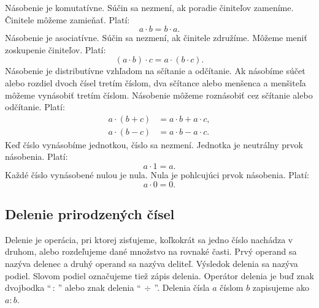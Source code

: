 \documentclass{article}
\begin{document}
Násobenie je komutatívne. Súčin sa nezmení, ak poradie činiteľov zameníme. Činitele môžeme zamieňať. Platí:
\[
a \cdot b = b \cdot a.
\]
Násobenie je asociatívne. Súčin sa nezmení, ak činitele združíme. Môžeme meniť zoskupenie činiteľov. Platí:
\[
(a \cdot b) \cdot c = a \cdot (b \cdot c).
\]
Násobenie je distributívne vzhľadom na sčítanie a odčítanie. Ak násobíme súčet alebo rozdiel dvoch čísel tretím číslom, dva sčítance alebo menšenca a menšiteľa môžeme vynásobiť tretím číslom. Násobenie môžeme roznásobiť cez sčítanie alebo odčítanie. Platí:
\[
\begin{aligned}
  a \cdot (b + c) &= a \cdot b + a \cdot c, \\
  a \cdot (b - c) &= a \cdot b - a \cdot c.
\end{aligned}
\]
Keď číslo vynásobíme jednotkou, číslo sa nezmení. Jednotka je neutrálny prvok násobenia. Platí:
\[
a \cdot 1 = a.
\]
Každé číslo vynásobené nulou je nula. Nula je pohlcujúci prvok násobenia. Platí:
\[
a \cdot 0 = 0.
\]

\subsection{Delenie prirodzených čísel}

Delenie je operácia, pri ktorej zisťujeme, koľkokrát sa jedno číslo nachádza v druhom, alebo rozdeľujeme dané množstvo na rovnaké časti. Prvý operand sa nazýva delenec a druhý operand sa nazýva deliteľ. Výsledok delenia sa nazýva podiel. Slovom podiel označujeme tiež zápis delenia. Operátor delenia je buď znak dvojbodka \enquote{\(\, :\, \)} alebo znak delenia \enquote{\(\, \div \,\)}. Delenia čísla \(a\) číslom \(b\) zapisujeme ako \(a : b\).
\end{document}

